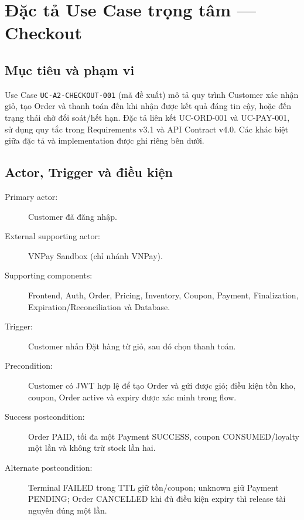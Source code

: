 \section{Đặc tả Use Case trọng tâm --- Checkout}
\label{sec:a2-checkout}

\subsection{Mục tiêu và phạm vi}
Use Case \texttt{UC-A2-CHECKOUT-001} (mã đề xuất) mô tả quy trình Customer
xác nhận giỏ, tạo Order và thanh toán đến khi nhận được kết quả đáng tin cậy,
hoặc đến trạng thái chờ đối soát/hết hạn. Đặc tả liên kết UC-ORD-001 và
UC-PAY-001, sử dụng quy tắc trong Requirements v3.1 và API Contract v4.0.
Các khác biệt giữa đặc tả và implementation được ghi riêng bên dưới.

\subsection{Actor, Trigger và điều kiện}
\begin{description}
\item[Primary actor:] Customer đã đăng nhập.
\item[External supporting actor:] VNPay Sandbox (chỉ nhánh VNPay).
\item[Supporting components:] Frontend, Auth, Order, Pricing, Inventory, Coupon,
Payment, Finalization, Expiration/Reconciliation và Database.
\item[Trigger:] Customer nhấn Đặt hàng từ giỏ, sau đó chọn thanh toán.
\item[Precondition:] Customer có JWT hợp lệ để tạo Order và gửi được giỏ;
điều kiện tồn kho, coupon, Order active và expiry được xác minh trong flow.
\item[Success postcondition:] Order PAID, tối đa một Payment SUCCESS,
coupon CONSUMED/loyalty một lần và không trừ stock lần hai.
\item[Alternate postcondition:] Terminal FAILED trong TTL giữ tồn/coupon;
unknown giữ Payment PENDING; Order CANCELLED khi đủ điều kiện expiry thì
release tài nguyên đúng một lần.
\end{description}

